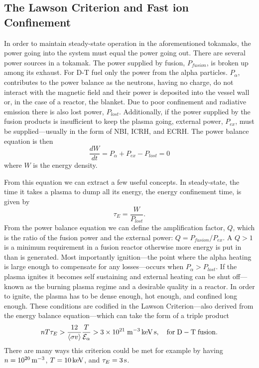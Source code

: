 \subsection{The Lawson Criterion and Fast ion Confinement}
In order to maintain steady-state operation in the aforementioned tokamaks, the power going into the system must equal the power going out. There are several power sources in a tokamak. The power supplied by fusion, $P_{fusion}$, is broken up among its exhaust. For D-T fuel only the power from the alpha particles. $P_\alpha$, contributes to the power balance as the neutrons, having no charge, do not interact with the magnetic field and their power is deposited into the vessel wall or, in the case of a reactor, the blanket. Due to poor confinement and radiative emission there is also lost power, $P_{lost}$. Additionally, if the power supplied by the fusion products is insufficient to keep the plasma going, external power, $P_{ex}$, must be supplied---usually in the form of NBI, ICRH, and ECRH. The power balance equation is then
\begin{equation}\label{eq:power_balance}
    \frac{dW}{dt} = P_\alpha + P_{ex} - P_{lost} = 0
\end{equation}
where $W$ is the energy density.

From this equation we can extract a few useful concepts. In steady-state, the time it takes a plasma to dump all its energy, the energy confinement time, is given by
\begin{equation}\label{eq:tau_e}
    \tau_E = \frac{W}{P_{lost}}.
\end{equation}
From the power balance equation we can define the amplification factor, $Q$, which is the ratio of the fusion power and the external power: $Q = P_{fusion}/P_{ex}$. A $Q > 1$ is a minimum requirement in a fusion reactor otherwise more energy is put in than is generated. Most importantly ignition---the point where the alpha heating is large enough to compensate for any losses---occurs when $P_\alpha > P_{lost}$. If the plasma ignites it becomes self sustaining and external heating can be shut off---known as the burning plasma regime and a desirable quality in a reactor.
In order to ignite, the plasma has to be dense enough, hot enough, and confined long enough. These conditions are codified in the Lawson Criterion---also derived from the energy balance equation---which can take the form of a triple product
\begin{equation}\label{eq:lawson}
    nT\tau_E > \frac{12}{\langle \sigma v \rangle} \frac{T}{\mathcal{E}_\alpha} > 3\times10^{21} \; \rm{m^{-3}\, keV\, s}, \quad \rm{for\;D-T\;fusion}.
\end{equation}
There are many ways this criterion could be met for example by having $n = 10^{20}\, \rm{m^{-3}}$, $T = 10\,\rm{keV}$, and $\tau_E = 3\,\rm{s}$.

